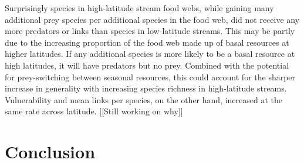 \documentclass[12pt]{article}
\begin{document}
Surprisingly species in high-latitude stream food webs, while gaining many
additional prey species per additional species in the food web, did not
receive any more predators or links than species in low-latitude streams. 
This may be partly due to the increasing proportion of the food web made up of
basal resources at higher latitudes. If any additional species is more likely to
be a basal resource at high latitudes, it will have predators but no prey.
Combined with the potential for prey-switching between seasonal resources, this 
could account for the sharper increase in generality with increasing species richness
in high-latitude streams. Vulnerability and mean links per species, on the other hand,
increased at the same rate across latitude. [[Still working on why]]


\section*{Conclusion}



\newpage

\newpage


\end{document}
